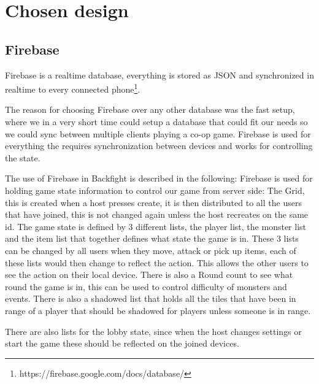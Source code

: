 \pagestyle{Uni}

\chapter{Chosen design}

\section{Firebase}
Firebase is a realtime database, everything is stored as JSON and synchronized in realtime to every connected phone\footnote{https://firebase.google.com/docs/database/}.

The reason for choosing Firebase over any other database was the fast setup, where we in a very short time could setup a database that could fit our needs so we could sync between multiple clients playing a co-op game. Firebase is used for everything the requires synchronization between devices and works for controlling the state.

The use of Firebase in Backfight is described in the following:
Firebase is used for holding game state information to control our game from server side:
The Grid, this is created when a host presses create, it is then distributed to all the users that have joined, this is not changed again unless the host recreates on the same id.
The game state is defined by 3 different lists, the player list, the monster list and the item list that together defines what state the game is in. These 3 lists can be changed by all users when they move, attack or pick up items, each of these lists would then change to reflect the action. This allows the other users to see the action on their local device. 
There is also a Round count to see what round the game is in, this can be used to control difficulty of monsters and events. There is also a shadowed list that holds all the tiles that have been in range of a player that should be shadowed for players unless someone is in range.

There are also lists for the lobby state, since when the host changes settings or start the game these should be reflected on the joined devices.